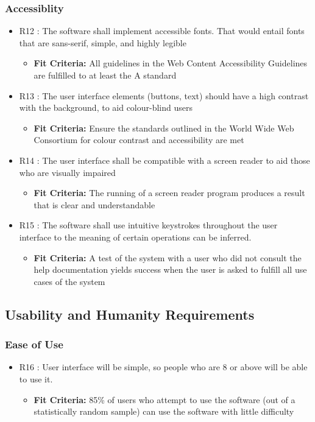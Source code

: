 \documentclass[12pt, titlepage]{article}
\begin{document}
\subsubsection{Accessiblity}
\begin{itemize}
\item{R12 : The software shall implement accessible fonts. That would entail fonts that are sans-serif, simple, and highly legible}
\begin{itemize}
\item{\textbf{Fit Criteria:} All guidelines in the Web Content Accessibility Guidelines are fulfilled to at least the A standard \cite{ontario.ca}}
\end{itemize}
\item{R13 : The user interface elements (buttons, text) should have a high contrast with the background, to aid colour-blind users}
\begin{itemize}
\item{\textbf{Fit Criteria:} Ensure the standards outlined in the World Wide Web Consortium for colour contrast and accessibility are met}
\end{itemize}
\item{R14 : The user interface shall be compatible with a screen reader to aid those who are visually impaired}
\begin{itemize}
\item{\textbf{Fit Criteria:} The running of a screen reader program produces a result that is clear and understandable}
\end{itemize}
\item{R15 : The software shall use intuitive keystrokes throughout the user interface to the meaning of certain operations can be inferred.}
\begin{itemize}
\item{\textbf{Fit Criteria:} A test of the system with a user who did not consult the help documentation yields success when the user is asked to fulfill all use cases of the system}
\end{itemize}
\end{itemize}
\subsection{Usability and Humanity Requirements}
\subsubsection{Ease of Use}
\begin{itemize}
\item{R16 : User interface will be simple, so people who are 8 or above will be able to use it.}
\begin{itemize}
\item{\textbf{Fit Criteria:} 85\% of users who attempt to use the software (out of a statistically random sample) can use the software with little difficulty}
\end{itemize}
\end{itemize}
\end{document}
